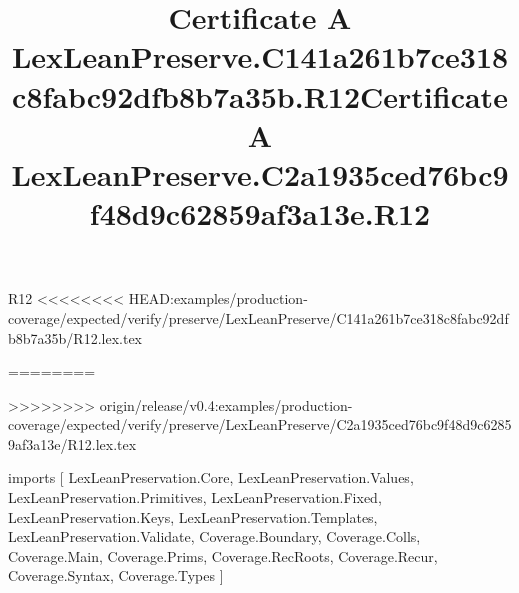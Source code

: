 \begin{lexlean}{R12}
<<<<<<<< HEAD:examples/production-coverage/expected/verify/preserve/LexLeanPreserve/C141a261b7ce318c8fabc92dfb8b7a35b/R12.lex.tex
\title{Certificate A LexLeanPreserve.C141a261b7ce318c8fabc92dfb8b7a35b.R12}
========
\title{Certificate A LexLeanPreserve.C2a1935ced76bc9f48d9c62859af3a13e.R12}
>>>>>>>> origin/release/v0.4:examples/production-coverage/expected/verify/preserve/LexLeanPreserve/C2a1935ced76bc9f48d9c62859af3a13e/R12.lex.tex
\begin{coremodule}
imports [
  LexLeanPreservation.Core,
  LexLeanPreservation.Values,
  LexLeanPreservation.Primitives,
  LexLeanPreservation.Fixed,
  LexLeanPreservation.Keys,
  LexLeanPreservation.Templates,
  LexLeanPreservation.Validate,
  Coverage.Boundary,
  Coverage.Colls,
  Coverage.Main,
  Coverage.Prims,
  Coverage.RecRoots,
  Coverage.Recur,
  Coverage.Syntax,
  Coverage.Types
]


\end{coremodule}
\end{lexlean}
